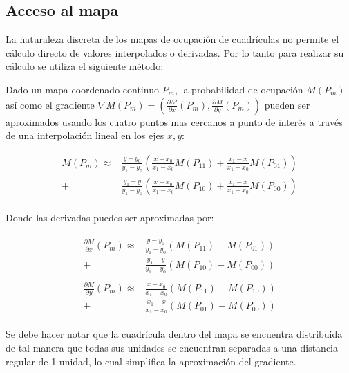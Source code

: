 \documentclass[10pt,a4paper]{article}
\begin{document}
\subsection{Acceso al mapa}

La naturaleza discreta de los mapas de ocupación de cuadrículas no permite el cálculo directo de valores interpolados o derivadas. Por lo tanto para realizar su cálculo se utiliza el siguiente método:

Dado un mapa coordenado continuo $ P_{m} $, la probabilidad de ocupación $ M(P_{m}) $ así como el gradiente 
$\nabla M(P_{m}) =  ( 
\frac{\partial M}{\partial x} (P_{m}),
\frac{\partial M}{\partial y} (P_{m})
)$
pueden ser aproximados usando los cuatro puntos mas cercanos a punto de interés a través de una interpolación lineal en los ejes $ x, y $:

\begin{equation}
	\begin{aligned}
	M(P_{m}) \approx
		&
		\frac{y - y_{0}}{y_{1} - y_{0}} \left(
			\frac{x - x_{0}}{x_{1} - x_{0}} M(P_{11}) +
			\frac{x_{1} - x}{x_{1} - x_{0}} M(P_{01})
		\right)
		\\ + &
		\frac{y_{1} - y}{y_{1} - y_{0}} \left(
			\frac{x - x_{0}}{x_{1} - x_{0}}	M(P_{10}) +	
			\frac{x_{1} - x}{x_{1} - x_{0}} M(P_{00})
		\right)	
	\end{aligned}
\end{equation} \\

Donde las derivadas puedes ser aproximadas por:

\begin{align}
	\begin{aligned}
		\frac{\partial M}{\partial x} (P_{m}) \approx
		&
			\frac{y - y_{0}}{y_{1} - y_{0}} ( M(P_{11}) - M(P_{01}) )
		\\ + &
			\frac{y_{1} - y}{y_{1} - y_{0}} ( M(P_{10}) - M(P_{00}) )
	\end{aligned} \\
	\begin{aligned}
		\frac{\partial M}{\partial y} (P_{m}) \approx
		&
			\frac{x - x_{0}}{x_{1} - x_{0}} ( M(P_{11}) - M(P_{10}) )
		\\ + &
			\frac{x_{1} - x}{x_{1} - x_{0}} ( M(P_{01}) - M(P_{00}) )
	\end{aligned}
\end{align}

Se debe hacer notar que la cuadrícula dentro del mapa se encuentra distribuida de tal manera que todas sus unidades se encuentran separadas a una distancia regular de 1 unidad, lo cual simplifica la aproximación del gradiente.
\end{document}
